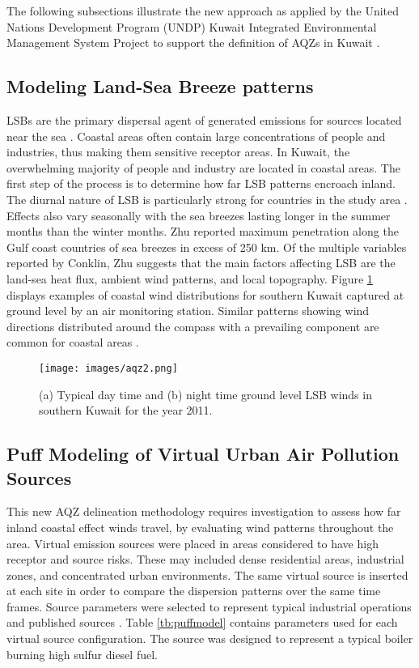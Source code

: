 The following subsections illustrate the new approach as applied by the United Nations Development Program (UNDP) Kuwait Integrated Environmental Management System Project to support the definition of AQZs in Kuwait \citep{Freeman2013}.  

\subsection{Modeling Land-Sea Breeze patterns}

LSBs are the primary dispersal agent of generated emissions for sources located near the sea \citep{Cuxart2014}.  Coastal areas often contain large concentrations of people and industries, thus making them sensitive receptor areas.  In Kuwait, the overwhelming majority of people and industry are located in coastal areas.  The first step of the process is to determine how far LSB patterns encroach inland.  The diurnal nature of LSB is particularly strong for countries in the study area \citep{Zhu2004}.  Effects also vary seasonally with the sea breezes lasting longer in the summer months than the winter months.  Zhu reported maximum penetration along the Gulf coast countries of sea breezes in excess of 250 km.  Of the multiple variables reported by Conklin, Zhu suggests that the main factors affecting LSB are the land-sea heat flux, ambient wind patterns, and local topography.  Figure \ref{fig:LSBwinds} displays examples of coastal wind distributions for southern Kuwait captured at ground level by an air monitoring station.  Similar patterns showing wind directions distributed around the compass with a prevailing component are common for coastal areas \citep{Lozano2013}.

%
\begin{figure}
\texttt{[image: images/aqz2.png]} 
\caption{(a) Typical day time and (b) night time ground level LSB winds in southern Kuwait for the year 2011.}
\label{fig:LSBwinds}
\end{figure}
% 
\subsection{Puff Modeling of Virtual Urban Air Pollution Sources}

This new AQZ delineation methodology requires investigation to assess how far inland coastal effect winds travel, by evaluating wind patterns throughout the area.  Virtual emission sources were placed in areas considered to have high receptor and source risks.  These may included dense residential areas, industrial zones, and concentrated urban environments.  The same virtual source is inserted at each site in order to compare the dispersion patterns over the same time frames. Source parameters were selected to represent typical industrial operations and published sources \citep{Chusai2012}. Table \ref{tb:puffmodel} contains parameters used for each virtual source configuration.  The source was designed to represent a typical boiler burning high sulfur diesel fuel.

